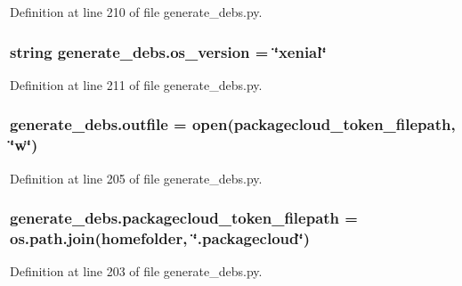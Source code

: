 Definition at line 210 of file generate\+\_\+debs.\+py.

\subsubsection[{\texorpdfstring{os\+\_\+version}{os_version}}]{\setlength{\rightskip}{0pt plus 5cm}string generate\+\_\+debs.\+os\+\_\+version = \char`\"{}xenial\char`\"{}}\hypertarget{namespacegenerate__debs_afb8badf2c49de1c3be06aefc87f38932}{}\label{namespacegenerate__debs_afb8badf2c49de1c3be06aefc87f38932}


Definition at line 211 of file generate\+\_\+debs.\+py.

\subsubsection[{\texorpdfstring{outfile}{outfile}}]{\setlength{\rightskip}{0pt plus 5cm}generate\+\_\+debs.\+outfile = open({\bf packagecloud\+\_\+token\+\_\+filepath}, \char`\"{}w\char`\"{})}\hypertarget{namespacegenerate__debs_aa1faa039b35b72ee44dc6f106ad12911}{}\label{namespacegenerate__debs_aa1faa039b35b72ee44dc6f106ad12911}


Definition at line 205 of file generate\+\_\+debs.\+py.

\subsubsection[{\texorpdfstring{packagecloud\+\_\+token\+\_\+filepath}{packagecloud_token_filepath}}]{\setlength{\rightskip}{0pt plus 5cm}generate\+\_\+debs.\+packagecloud\+\_\+token\+\_\+filepath = os.\+path.\+join({\bf homefolder}, \char`\"{}.packagecloud\char`\"{})}\hypertarget{namespacegenerate__debs_a836a20b989c3c8e46255d91d10cb524f}{}\label{namespacegenerate__debs_a836a20b989c3c8e46255d91d10cb524f}


Definition at line 203 of file generate\+\_\+debs.\+py.

